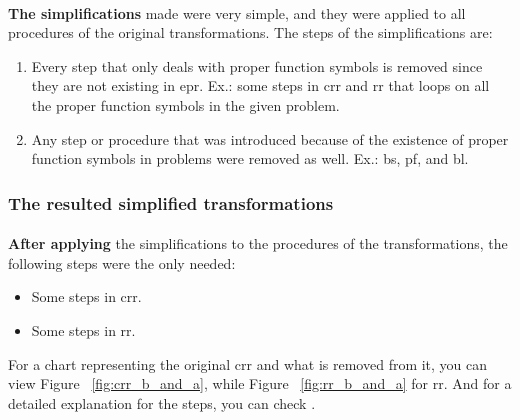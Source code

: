 		\paragraph{}
		\textbf{The simplifications} made were very simple, and they were applied to all procedures of the original transformations. The steps of the simplifications are:
		
			\begin{enumerate}
				\item Every step that only deals with proper function symbols is removed since they are not existing in \ac{epr}. Ex.: some steps in \ac{crr} and \ac{rr} that loops on all the proper function symbols in the given problem.
				\item Any step or procedure that was introduced because of the existence of proper function symbols in problems were removed as well. Ex.: \ac{bs}, \ac{pf}, and \ac{bl}.
			\end{enumerate}
		
	\subsubsection{The resulted simplified transformations}
		\paragraph{}
		\textbf{After applying} the simplifications to the procedures of the transformations, the following steps were the only needed:
			
			\begin{itemize}
				\item Some steps in \ac{crr}.
				\item Some steps in \ac{rr}.
			\end{itemize}
			
		
		For a chart representing the original \ac{crr} and what is removed from it, you can view Figure ~\ref{fig:crr_b_and_a}, while Figure ~\ref{fig:rr_b_and_a} for \ac{rr}. And for a detailed explanation for the steps, you can check \cite{BMUG06}. 
		

